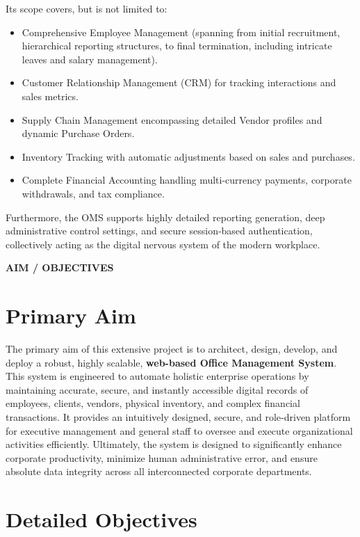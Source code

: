 ﻿\documentclass[12pt,a4paper]{report}
\begin{document}
Its scope covers, but is not limited to:
\begin{itemize}
    \item Comprehensive Employee Management (spanning from initial recruitment, hierarchical reporting structures, to final termination, including intricate leaves and salary management).
    \item Customer Relationship Management (CRM) for tracking interactions and sales metrics.
    \item Supply Chain Management encompassing detailed Vendor profiles and dynamic Purchase Orders.
    \item Inventory Tracking with automatic adjustments based on sales and purchases.
    \item Complete Financial Accounting handling multi-currency payments, corporate withdrawals, and tax compliance.
\end{itemize}
Furthermore, the OMS supports highly detailed reporting generation, deep administrative control settings, and secure session-based authentication, collectively acting as the digital nervous system of the modern workplace.

\newpage
\vspace*{\fill}
\begin{center}
{\LARGE \textbf{AIM / OBJECTIVES}}
\end{center}
\vspace*{\fill}

\newpage
\section*{Primary Aim}
The primary aim of this extensive project is to architect, design, develop, and deploy a robust, highly scalable, \textbf{web-based Office Management System}. This system is engineered to automate holistic enterprise operations by maintaining accurate, secure, and instantly accessible digital records of employees, clients, vendors, physical inventory, and complex financial transactions. It provides an intuitively designed, secure, and role-driven platform for executive management and general staff to oversee and execute organizational activities efficiently. Ultimately, the system is designed to significantly enhance corporate productivity, minimize human administrative error, and ensure absolute data integrity across all interconnected corporate departments.

\section*{Detailed Objectives}
\end{document}

